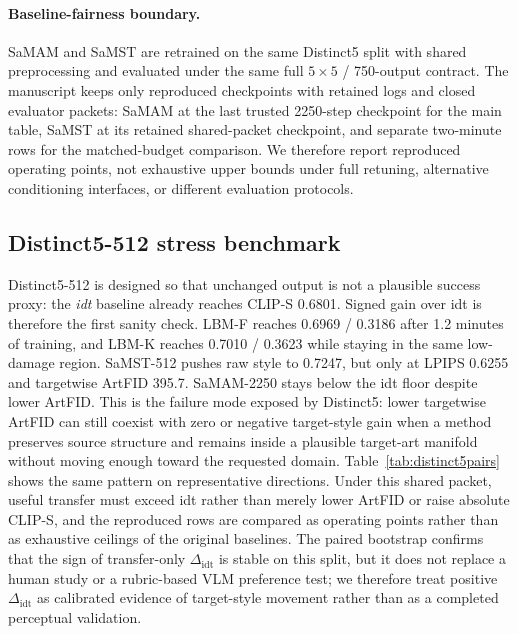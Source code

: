 \documentclass[letterpaper]{article}
\begin{document}
\paragraph{Baseline-fairness boundary.}
SaMAM and SaMST are retrained on the same Distinct5 split with shared preprocessing and evaluated under the same full $5\times5$ / 750-output contract. The manuscript keeps only reproduced checkpoints with retained logs and closed evaluator packets: SaMAM at the last trusted 2250-step checkpoint for the main table, SaMST at its retained shared-packet checkpoint, and separate two-minute rows for the matched-budget comparison. We therefore report reproduced operating points, not exhaustive upper bounds under full retuning, alternative conditioning interfaces, or different evaluation protocols.

\subsection{Distinct5-512 stress benchmark}
Distinct5-512 is designed so that unchanged output is not a plausible success proxy: the \emph{idt} baseline already reaches CLIP-S 0.6801. Signed gain over idt is therefore the first sanity check. LBM-F reaches 0.6969 / 0.3186 after 1.2 minutes of training, and LBM-K reaches 0.7010 / 0.3623 while staying in the same low-damage region. SaMST-512 pushes raw style to 0.7247, but only at LPIPS 0.6255 and targetwise ArtFID 395.7. SaMAM-2250 stays below the idt floor despite lower ArtFID. This is the failure mode exposed by Distinct5: lower targetwise ArtFID can still coexist with zero or negative target-style gain when a method preserves source structure and remains inside a plausible target-art manifold without moving enough toward the requested domain. Table~\ref{tab:distinct5pairs} shows the same pattern on representative directions. Under this shared packet, useful transfer must exceed idt rather than merely lower ArtFID or raise absolute CLIP-S, and the reproduced rows are compared as operating points rather than as exhaustive ceilings of the original baselines. The paired bootstrap confirms that the sign of transfer-only $\Delta_{\mathrm{idt}}$ is stable on this split, but it does not replace a human study or a rubric-based VLM preference test; we therefore treat positive $\Delta_{\mathrm{idt}}$ as calibrated evidence of target-style movement rather than as a completed perceptual validation.
\end{document}

